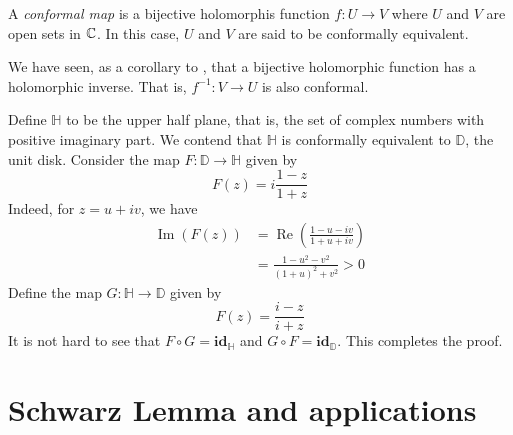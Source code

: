 \begin{definition}
    A \textit{conformal map} is a bijective holomorphis function $f: U\to V$ where $U$ and $V$ are open sets in $\mathbb{C}$. In this case, $U$ and $V$ are said to be conformally equivalent.
\end{definition}

We have seen, as a corollary to , that a bijective holomorphic function has a holomorphic inverse. That is, $f^{-1}: V\to U$ is also conformal.

\begin{example}
    Define $\mathbb H$ to be the upper half plane, that is, the set of complex numbers with positive imaginary part. We contend that $\mathbb H$ is conformally equivalent to $\mathbb D$, the unit disk. Consider the map $F:\mathbb D\to\mathbb H$ given by
    \begin{equation*}
        F(z) = i\frac{1 - z}{1 + z}
    \end{equation*}
    Indeed, for $z = u + iv$, we have 
    \begin{align*}
        \operatorname{Im}(F(z)) &= \operatorname{Re}\left(\frac{1 - u - iv}{1 + u + iv}\right)\\
        &= \frac{1 - u^2 - v^2}{(1 + u)^2 + v^2} > 0
    \end{align*}
    Define the map $G:\mathbb H\to\mathbb D$ given by
    \begin{equation*}
        F(z) = \frac{i - z}{i + z}
    \end{equation*}
    It is not hard to see that $F\circ G = \mathbf{id}_{\mathbb H}$ and $G\circ F = \mathbf{id}_{\mathbb D}$. This completes the proof.
\end{example}

\section{Schwarz Lemma and applications}

